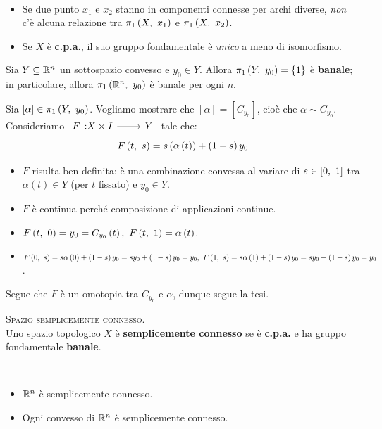 \begin{observes}~{}
	\begin{itemize}
		\item Se due punto $x_1$ e $x_2$ stanno in componenti connesse per archi diverse, \textit{non} c'è alcuna relazione tra $\gruf{X}{x_1}$ e $\gruf{X}{x_2}$.
		\item Se $X$ è \textbf{c.p.a.}, il suo gruppo fondamentale è \textit{unico} a meno di isomorfismo.
	\end{itemize}
\vspace{-3mm}
\end{observes}
\begin{example}
	Sia $Y\subseteq \mathbb{R}^n$ un sottospazio convesso e $y_0\in Y$.
	Allora $\gruf{Y}{y_0}=\left\{1\right\}$ è \textbf{banale}; in particolare, allora $\gruf{\realset^n}{y_0}$ è banale per ogni $n$.
\end{example}
\begin{demonstration}
	Sia $\left[\alpha\right]\in\gruf{Y}{y_0}$. Vogliamo mostrare che $\left[\alpha\right]=\left[C_{y_0}\right]$, cioè che $\alpha\sim C_{y_0}$.\\
	Consideriamo $\funz{F}{X\times I}{Y}$ tale che:
	\begin{equation*}
		F\left(t,\ s\right)=s\left(\alpha\left(t\right)\right)+\left(1-s\right)y_0
	\end{equation*}
\begin{itemize}
	\item $F$ risulta ben definita: è una combinazione convessa al variare di $s\in\left[0,\ 1\right]$ tra $\alpha\left(t\right)\in Y$ (per $t$ fissato) e $y_0\in Y$.
	\item $F$ è continua perché composizione di applicazioni continue.
	\item $\mvf{F}{t}{0}=y_0=C_{y_0}\left(t\right),\ \mvf{F}{t}{1}=\alpha\left(t\right)$.
	\item $\mvf{F}{0}{s}=s\alpha\left(0\right)+\left(1-s\right)y_0=sy_0+\left(1-s\right)y_0=y_0,\ \mvf{F}{1}{s}=s\alpha\left(1\right)+\left(1-s\right)y_0=sy_0+\left(1-s\right)y_0=y_0$.
\end{itemize}
Segue che $F$ è un omotopia tra $C_{y_0}$ e $\alpha$, dunque segue la tesi.
\end{demonstration}
\begin{define}\textsc{Spazio semplicemente connesso.}\\
	Uno spazio topologico $X$ è \textbf{semplicemente connesso} se è \textbf{c.p.a.} e ha gruppo fondamentale \textbf{banale}.
\end{define}
\begin{examples}~{}
	\begin{itemize}
		\item $\mathbb{R}^n$ è semplicemente connesso.
		\item Ogni convesso di $\mathbb{R}^n$ è semplicemente connesso.
	\end{itemize}
\vspace{-3mm}
\end{examples}
